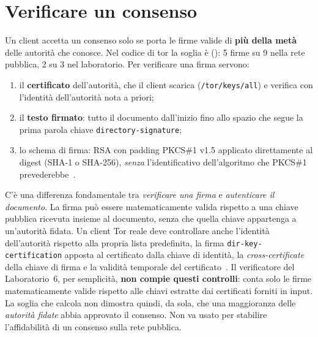 \section{Verificare un consenso}\label{sec:dir-firme}

Un client accetta un consenso solo se porta le firme valide di \textbf{più della metà} delle autorità che conosce. Nel codice di tor la soglia è  (): 5 firme su 9 nella rete pubblica, 2 su 3 nel laboratorio. Per verificare una firma servono:
\begin{enumerate}
  \item il \textbf{certificato} dell'autorità, che il client scarica (\nolinkurl{/tor/keys/all}) e verifica con l'identità dell'autorità nota a priori;
  \item il \textbf{testo firmato}: tutto il documento dall'inizio fino allo spazio che segue la prima parola chiave \texttt{directory-signature};
  \item lo schema di firma: RSA con padding PKCS\#1 v1.5 applicato direttamente al digest (SHA-1 o SHA-256), \emph{senza} l'identificativo dell'algoritmo che PKCS\#1 prevederebbe~.
\end{enumerate}

\begin{attenzione}
C'è una differenza fondamentale tra \emph{verificare una firma} e
\emph{autenticare il documento}. La firma può essere matematicamente valida
rispetto a una chiave pubblica ricevuta insieme al documento, senza che
quella chiave appartenga a un'autorità fidata. Un client Tor reale deve
controllare anche l'identità dell'autorità rispetto alla propria lista
predefinita, la firma \texttt{dir-key-certification} apposta al certificato
dalla chiave di identità, la \emph{cross-certificate} della chiave di firma
e la validità temporale del certificato~.
Il verificatore del Laboratorio~6, per semplicità, \textbf{non compie
questi controlli}: conta solo le firme matematicamente valide rispetto alle
chiavi estratte dai certificati forniti in input. La soglia che calcola
non dimostra quindi, da sola, che una maggioranza delle \emph{autorità
fidate} abbia approvato il consenso. Non va usato per stabilire
l'affidabilità di un consenso sulla rete pubblica.
\end{attenzione}

